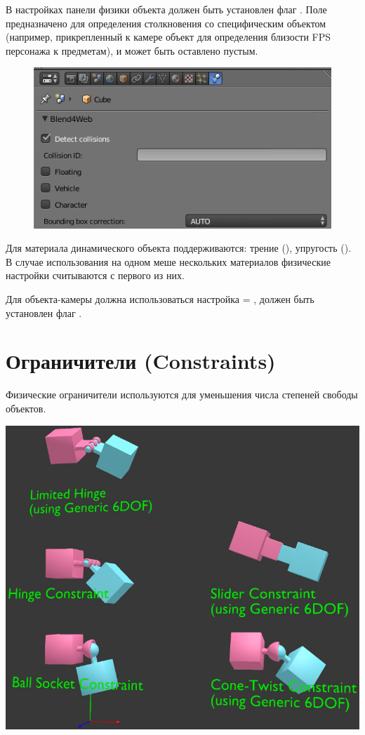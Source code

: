 \documentclass[a4paper,12pt,oneside]{sphinxmanual}
\begin{document}
В настройках панели физики объекта должен быть установлен флаг . Поле  предназначено для определения столкновения со специфическим объектом (например, прикрепленный к камере объект для определения близости FPS персонажа к предметам), и может быть оставлено пустым.
\begin{figure}[htbp]
\centering

\includegraphics[width=0.800\linewidth]{object.jpg}
\end{figure}

\begin{DUlineblock}{0em}
\item[] 
\end{DUlineblock}

Для материала динамического объекта поддерживаются: трение (), упругость (). В случае использования на одном меше нескольких материалов физические настройки считываются с первого из них.

Для объекта-камеры должна использоваться настройка  = , должен быть установлен флаг .


\section{Ограничители (Constraints)}
\label{physics:constraints}
Физические ограничители используются для уменьшения числа степеней свободы объектов.

\includegraphics[width=1.000\linewidth]{physics_constraints.jpg}
\end{document}
